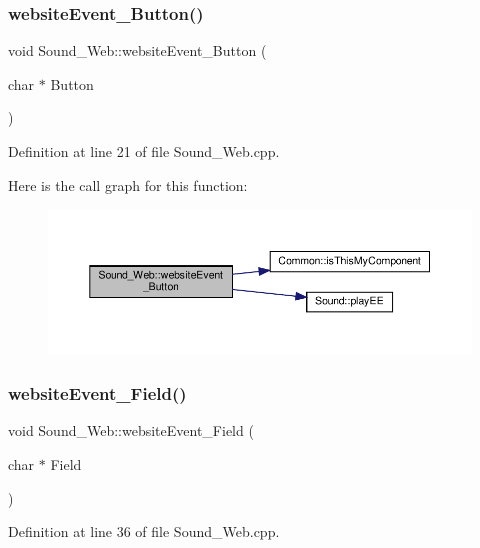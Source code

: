 \subsubsection{\texorpdfstring{website\+Event\+\_\+\+Button()}{websiteEvent\_Button()}}
{\footnotesize\ttfamily void Sound\+\_\+\+Web\+::website\+Event\+\_\+\+Button (\begin{DoxyParamCaption}\item[{char $\ast$}]{Button }\end{DoxyParamCaption})}



Definition at line 21 of file Sound\+\_\+\+Web.\+cpp.

Here is the call graph for this function\+:
\nopagebreak
\begin{figure}[H]
\begin{center}
\leavevmode
\includegraphics[width=350pt]{class_sound___web_ab55e679fab59cd3fae2b7900d31a0893_cgraph}
\end{center}
\end{figure}
\mbox{\label{class_sound___web_a3f9b60318e13f510c7ed49cc52962424}} 
\subsubsection{\texorpdfstring{website\+Event\+\_\+\+Field()}{websiteEvent\_Field()}}
{\footnotesize\ttfamily void Sound\+\_\+\+Web\+::website\+Event\+\_\+\+Field (\begin{DoxyParamCaption}\item[{char $\ast$}]{Field }\end{DoxyParamCaption})}



Definition at line 36 of file Sound\+\_\+\+Web.\+cpp.

